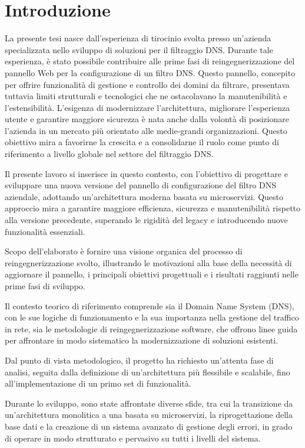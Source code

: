 \chapter{Introduzione}

La presente tesi nasce dall’esperienza di tirocinio svolta presso un’azienda specializzata nello sviluppo di soluzioni per il filtraggio DNS. Durante tale esperienza, è stato possibile contribuire alle prime fasi di reingegnerizzazione del pannello Web per la configurazione di un filtro DNS. Questo pannello, concepito per offrire funzionalità di gestione e controllo dei domini da filtrare, presentava tuttavia limiti strutturali e tecnologici che ne ostacolavano la manutenibilità e l’estensibilità. L’esigenza di modernizzare l’architettura, migliorare l’esperienza utente e garantire maggiore sicurezza è nata anche dalla volontà di posizionare l’azienda in un mercato più orientato alle medie-grandi organizzazioni. Questo obiettivo mira a favorirne la crescita e a consolidarne il ruolo come punto di riferimento a livello globale nel settore del filtraggio DNS.

Il presente lavoro si inserisce in questo contesto, con l’obiettivo di progettare e sviluppare una nuova versione del pannello di configurazione del filtro DNS aziendale, adottando un’architettura moderna basata su microservizi. Questo approccio mira a garantire maggiore efficienza, sicurezza e manutenibilità rispetto alla versione precedente, superando le rigidità del legacy e introducendo nuove funzionalità essenziali.

Scopo dell’elaborato è fornire una visione organica del processo di reingegnerizzazione svolto, illustrando le motivazioni alla base della necessità di aggiornare il pannello, i principali obiettivi progettuali e i risultati raggiunti nelle prime fasi di sviluppo.

Il contesto teorico di riferimento comprende sia il Domain Name System (DNS), con le sue logiche di funzionamento e la sua importanza nella gestione del traffico in rete, sia le metodologie di reingegnerizzazione software, che offrono linee guida per affrontare in modo sistematico la modernizzazione di soluzioni esistenti.

Dal punto di vista metodologico, il progetto ha richiesto un'attenta fase di analisi, seguita dalla definizione di un’architettura più flessibile e scalabile, fino all’implementazione di un primo set di funzionalità.

Durante lo sviluppo, sono state affrontate diverse sfide, tra cui la transizione da un’architettura monolitica a una basata su microservizi, la riprogettazione della base dati e la creazione di un sistema avanzato di gestione degli errori, in grado di operare in modo strutturato e pervasivo su tutti i livelli del sistema.

